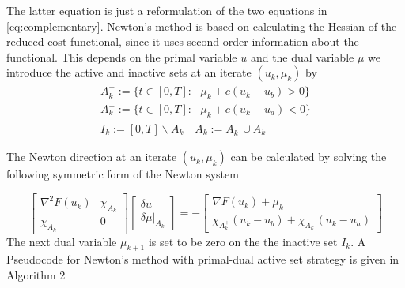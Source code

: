 The latter equation is just a reformulation of the two equations in \eqref{eq:complementary}. Newton's method is based on calculating the Hessian of the reduced cost functional, since it uses second order information about the functional. This depends on the primal variable $u$ and the dual variable $\mu$ we introduce the active and inactive sets at an iterate $(u_k, \mu_k)$ by 
\begin{align}
    \label{eq:active_inactive}
    A_k^{+} := \{ t \in [0,T]: \text{ } \mu_k + c(u_k - u_b) >0 \} \\
    A_k^{-} := \{ t \in [0,T]: \text{ } \mu_k + c(u_k - u_a) <0 \} \\
    I_k := [0,T] \backslash A_k \quad A_k := A_k^{+} \cup A_k^{-}
\end{align}

The Newton direction at an iterate $(u_k, \mu_k)$ can be calculated by solving the following symmetric form of the Newton system

\begin{equation}
    \label{eq:Newton_system}
    \begin{bmatrix}
        \nabla^2 F(u_k) & \chi_{A_k} \\
        \chi_{A_k} & 0 
    \end{bmatrix}
    \begin{bmatrix}
    \delta u \\
    \delta \mu|_{A_k}
    \end{bmatrix}
    = - \begin{bmatrix}
    \nabla F(u_k) + \mu_k \\
    \chi_{A_k^{+}}(u_k - u_b) + \chi_{A_k^{-}}(u_k - u_a)
    \end{bmatrix}
\end{equation}
The next dual variable $\mu_{k+1}$ is set to be zero on the the inactive set $I_k$. A Pseudocode for Newton's method with primal-dual active set strategy is given in Algorithm 2


